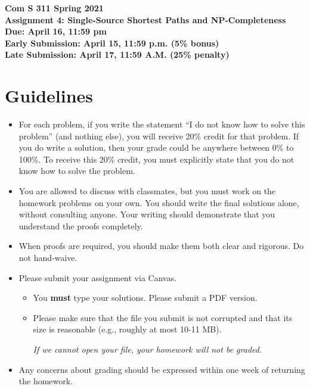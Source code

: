 \documentclass[12pt]{article}
\begin{document}
\pagestyle{plain}

\begin{center}
{\bf Com S 311 Spring 2021 \\}
{\Large \bf Assignment 4: Single-Source Shortest Paths and NP-Completeness \\}
{\bf Due: April 16, 11:59 pm \\}
{\bf Early Submission: April 15, 11:59 p.m. (5\% bonus) \\}
{\bf Late Submission: April 17, 11:59 A.M. (25\% penalty) }
\end{center}

\section*{\large Guidelines}

\begin{itemize}

\item %
For each problem, if you write  the statement ``I do not know how to solve this problem'' (and nothing else), you will receive 20\% credit for that problem. If you do write a solution, then your grade could be anywhere between 0\% to 100\%.
To receive this 20\% credit, you must explicitly state that you do not know how to solve the problem.

\item You are allowed to discuss with classmates, but you must work on the homework problems on your own.  You should write the final solutions alone, without consulting anyone. Your writing should demonstrate that you understand the proofs completely.

\item When proofs are required, you should make them both clear and rigorous. Do not hand-waive.

 \item Please submit your assignment via Canvas.
 \begin{itemize}
\item  You \textbf{must} type your solutions. Please submit a PDF version.
\item Please make sure that the file you submit is not corrupted and that its size is reasonable (e.g., roughly at most 10-11 MB).
\begin{center}
\emph{If we cannot open your file, your homework will not be graded.}
\end{center}
\end{itemize}

\item Any concerns about grading should be expressed within one week of
returning the homework.

\end{itemize}
\end{document}
